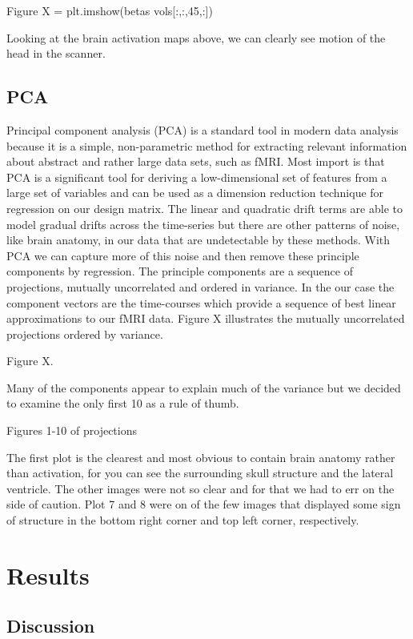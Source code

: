 \documentclass[11pt]{article}
\begin{document}
      Figure X = plt.imshow(betas vols[:,:,45,:])


Looking at the brain activation maps above, we can clearly see motion of the 
head in the scanner. 

\subsection{PCA}
Principal component analysis (PCA) is a standard tool in modern data analysis 
because it is a simple, non-parametric method for extracting relevant 
information about abstract and rather large data sets, such as fMRI.  Most 
import is that PCA is a significant tool for deriving a low-dimensional set of 
features from a large set of variables and can be used as a dimension reduction 
technique for regression on our design matrix. The linear and quadratic drift 
terms are able to model gradual drifts across the time-series but there are 
other patterns of noise, like brain anatomy, in our data that are undetectable 
by these methods. With PCA we can capture more of this noise and then remove 
these principle components by regression. The principle components are a 
sequence of projections, mutually uncorrelated and ordered in variance. In the 
our case the component vectors are the time-courses which provide a sequence of 
best linear approximations to our fMRI data.  Figure X illustrates the mutually 
uncorrelated projections ordered by variance.

	Figure X.

Many of the  components appear to explain much of the variance but we decided 
to examine the only first 10 as a rule of thumb.

	Figures 1-10 of projections

The first plot is the clearest and most obvious to contain brain anatomy rather 
than activation, for you can see the surrounding skull structure and the 
lateral ventricle. The other images were not so clear and for that we had to 
err on the side of caution. Plot 7 and 8 were on of the few images that 
displayed some sign of structure in the bottom right corner and top left 
corner, respectively.


\section{Results}

\subsection{Discussion}



\end{document}
